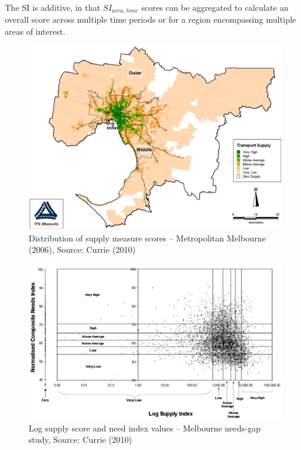 \documentclass[preprint, 3p,
authoryear]{elsarticle} %
\begin{document}
The SI is additive, in that \(SI_{area, time}\) scores can be aggregated
to calculate an overall score across multiple time periods or for a
region encompassing multiple areas of interest.

\begin{figure}
\includegraphics[width=1\linewidth]{graphics/Currie2010SI} \caption{Distribution of supply measure scores – Metropolitan Melbourne (2006), Source: Currie (2010)}\label{fig:Currie_map_SI}
\end{figure}

\begin{figure}
\includegraphics[width=1\linewidth]{graphics/Currie2010chart} \caption{Log supply score and need index values – Melbourne needs-gap study, Source: Currie (2010)}\label{fig:Currie_chart_gap}
\end{figure}
\end{document}
